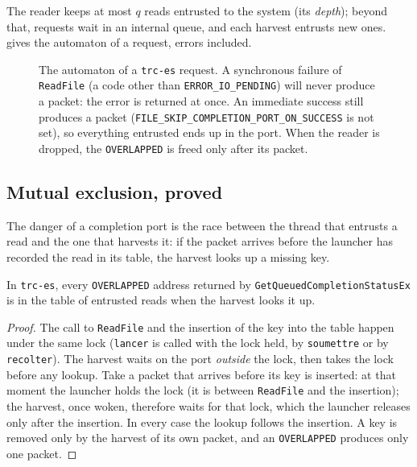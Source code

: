 The reader keeps at most $q$ reads entrusted to the system (its \emph{depth}); beyond that, requests wait in an internal queue, and each harvest entrusts new ones.  gives the automaton of a request, errors included.

\begin{figure}[ht]
\centering
\SchemaChmAutomate
\caption[The automaton of a \texttt{trc-es} request]{The automaton of a \texttt{trc-es} request. A synchronous failure of \texttt{ReadFile} (a code other than \texttt{ERROR\_IO\_PENDING}) will never produce a packet: the error is returned at once. An immediate success still produces a packet (\texttt{FILE\_SKIP\_\allowbreak COMPLETION\_\allowbreak PORT\_\allowbreak ON\_\allowbreak SUCCESS} is not set), so everything entrusted ends up in the port. When the reader is dropped, the \texttt{OVERLAPPED} is freed only after its packet.}
\label{fig:t2c-automate}
\end{figure}

\subsection{Mutual exclusion, proved}

The danger of a completion port is the race between the thread that entrusts a read and the one that harvests it: if the packet arrives before the launcher has recorded the read in its table, the harvest looks up a missing key.

\begin{lemme}\label{lem:t2c-exclusion}
In \texttt{trc-es}, every \texttt{OVERLAPPED} address returned by \texttt{GetQueued\allowbreak Completion\allowbreak StatusEx} is in the table of entrusted reads when the harvest looks it up.
\end{lemme}

\begin{proof}
The call to \texttt{ReadFile} and the insertion of the key into the table happen under the same lock (\texttt{lancer} is called with the lock held, by \texttt{soumettre} or by \texttt{recolter}). The harvest waits on the port \emph{outside} the lock, then takes the lock before any lookup. Take a packet that arrives before its key is inserted: at that moment the launcher holds the lock (it is between \texttt{ReadFile} and the insertion); the harvest, once woken, therefore waits for that lock, which the launcher releases only after the insertion. In every case the lookup follows the insertion. A key is removed only by the harvest of its own packet, and an \texttt{OVERLAPPED} produces only one packet.
\end{proof}

